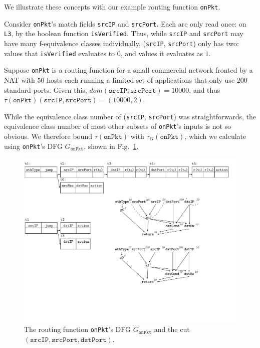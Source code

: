  We illustrate these concepts with our example routing function \texttt{onPkt}.

Consider \texttt{onPkt}'s match fields \texttt{srcIP} and \texttt{srcPort}. Each are only read once: on \texttt{L3}, by the boolean function \texttt{isVerified}. Thus, while \texttt{srcIP} and \texttt{srcPort} may have many f-equivalence classes individually, (\texttt{srcIP}, \texttt{srcPort}) only has two: values that \texttt{isVerified} evaluates to $0$, and values it evaluates as $1$.

Suppose \texttt{onPkt} is a routing function for a small commercial network fronted by a NAT with $50$ hosts each running a limited set of applications that only use $200$ standard ports. Given this, $dom(\texttt{srcIP}, \texttt{srcPort}) = 10000$, and thus $\tau(\texttt{onPkt})(\texttt{srcIP}, \texttt{srcPort}) = (10000, 2)$. 

While the equivalence class number of (\texttt{srcIP}, \texttt{srcPort}) was straightforwards, the equivalence class number of most other subsets of \texttt{onPkt}'s inputs is not so obvious. We therefore bound $\tau(\texttt{onPkt})$ with $\tau_G(\texttt{onPkt})$, which we calculate using \texttt{onPkt}'s DFG $G_{\texttt{onPkt}}$, shown in Fig.~\ref{fig:onpkt-dfg}.


\begin{figure}[tbh]
    \centering
    \vspace{-1mm}
    \includegraphics[scale = 0.6]{figures/figure5.pdf}
    \vspace{-2mm}
    \caption{The routing function \texttt{onPkt}'s DFG $G_{\texttt{onPkt}}$ and the cut $(\texttt{srcIP}, \texttt{srcPort}, \texttt{dstPort})$.}
    \label{fig:onpkt-dfg}
    \vspace{-2mm}
\end{figure}

